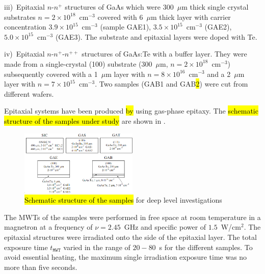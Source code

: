 \documentclass[10pt]{iopart}
\begin{document}
\noindent
iii)~Epitaxial $n$-$n^+$ structures of GaAs which were 300~$\mu$m thick single crystal substrates $n = 2 \times10^{18}$~cm$^{-3}$
   covered with 6~$\mu$m thick layer with carrier concentration $3.9\times10^{15}$~cm$^{-3}$
   (sample GAE1), $3.5\times10^{15}$~cm$^{-3}$ (GAE2),
   $5.0\times10^{15}$~cm$^{-3}$ (GAE3).
   The substrate and epitaxial layers were doped with Te.

\noindent
iv)~Epitaxial $n$-$n^+$-$n^{++}$ structures of GaAs:Te with a buffer layer.
 They were made from a single-crystal (100) substrate (300~$\mu$m, $n= 2\times10^{18}$~cm$^{-3}$)
  subsequently covered with a 1~$\mu$m layer with $n=8\times10^{16}$~cm$^{-3}$ and
  a 2~$\mu$m layer with $n=7\times10^{15}$~cm$^{-3}$.
  Two samples (GAB1 and GAB\hl{2}) were cut from different wafers.

Epitaxial systems have been produced \hl{by} using gas-phase epitaxy.
The \hl{schematic structure of the samples under study} are shown in .

\begin{figure}
\includegraphics[width=0.5\textwidth]{Fig1}
\caption{\label{figSamp_TAV}
\hl{Schematic structure of the samples} for deep level investigations
}%
\end{figure}

The MWTs of the samples were performed in free space at room temperature in a magnetron at a frequency of  $\nu=2.45$~GHz
and specific power of $1.5$~W/cm$^{2}$.
The epitaxial structures were irradiated onto the side of the epitaxial layer.
The total exposure time $t_\mathtt{MWT}$ varied in the range of $20-80$~s for the different samples.
To avoid essential heating, the maximum single irradiation exposure time was no more than  five seconds.
\end{document}
